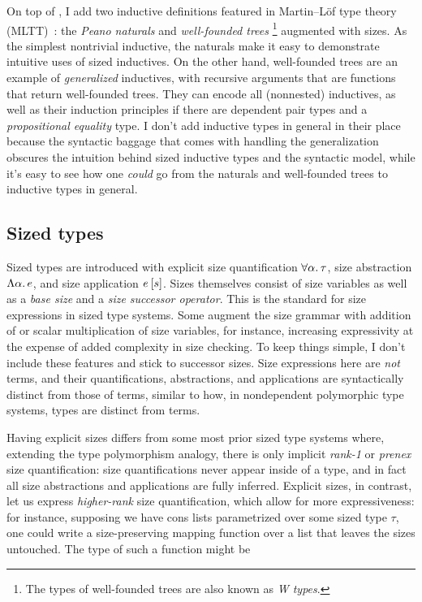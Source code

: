 On top of \GCC, I add two inductive definitions featured in Martin--L\"of type theory (MLTT)~\citep{MLTT}:
the \emph{Peano naturals} and \emph{well-founded trees}\punctstack{,}%
\footnote{The types of well-founded trees are also known as \emph{W types}.}
augmented with sizes.
As the simplest nontrivial inductive,
the naturals make it easy to demonstrate intuitive uses of sized inductives.
On the other hand, well-founded trees are an example of \emph{generalized} inductives,
with recursive arguments that are functions that return well-founded trees.
They can encode all (nonnested) inductives,
as well as their induction principles \citep{whynotW} if there are dependent pair types
and a \emph{propositional equality} type.
I don't add inductive types in general in their place
because the syntactic baggage that comes with handling the generalization
obscures the intuition behind sized inductive types and the syntactic model,
while it's easy to see how one \emph{could} go from the naturals and well-founded trees
to inductive types in general.

\subsection{Sized types}\label{sec:sized-types}

Sized types are introduced with explicit size quantification $\forall \alpha \mathpunct{.} \tau$,
size abstraction $\Lambda \alpha \mathpunct{.} e$, and size application $\App{e}{s}$.
Sizes themselves consist of size variables as well as a \emph{base size}
and a \emph{size successor operator}.
This is the standard for size expressions in sized type systems.
Some augment the size grammar with addition of or scalar multiplication of size variables,
for instance, increasing expressivity at the expense of added complexity in size checking.
To keep things simple, I don't include these features and stick to successor sizes.
Size expressions here are \emph{not} terms,
and their quantifications, abstractions, and applications
are syntactically distinct from those of terms,
similar to how, in nondependent polymorphic type systems,
types are distinct from terms.

Having explicit sizes differs from some most prior sized type systems where,
extending the type polymorphism analogy,
there is only implicit \emph{rank-1} or
\emph{prenex} size quantification:
size quantifications never appear inside of a type,
and in fact all size abstractions and applications are fully inferred.
Explicit sizes, in contrast, let us express
\emph{higher-rank} size quantification,
which allow for more expressiveness:
for instance, supposing we have cons lists parametrized over some sized type $\tau$,
one could write a size-preserving mapping function over a list
that leaves the sizes untouched.
The type of such a function might be

